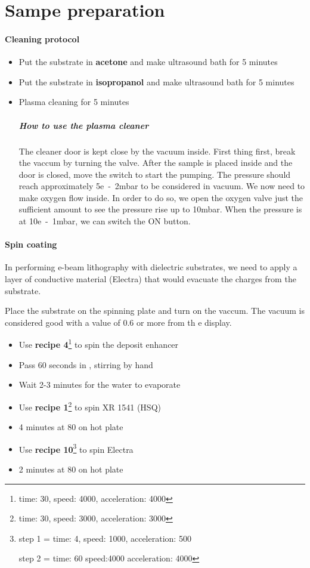 \documentclass[a4paper]{article}
\begin{document}
\section{Sampe preparation}

\paragraph{Cleaning protocol}
\begin{itemize}
  \item Put the substrate in \textbf{acetone} and make ultrasound bath for 5 minutes
  \item Put the substrate in \textbf{isopropanol} and make ultrasound bath for 5 minutes
  \item Plasma cleaning for 5 minutes
\subparagraph{How to use the plasma cleaner}
The cleaner door is kept close by the vacuum inside. First thing first, break the vaccum by turning the valve. After the sample is placed inside and the door is closed, move the switch to start the pumping. The pressure should reach approximately \unit{5e-2}{}mbar to be considered in vacuum. We now need to make oxygen flow inside. In order to do so, we open the oxygen valve just the sufficient amount to see the pressure rise up to \unit{10}{}mbar. When the pressure is at \unit{10e-1}{}mbar, we can switch the ON button.
\end{itemize}
\paragraph{Spin coating}
In performing e-beam lithography with dielectric substrates, we need to apply a layer of conductive material (Electra) that would evacuate the charges from the substrate.


Place the substrate on the spinning plate and turn on the vaccum. The vacuum is considered good with a value of 0.6 or more from th e display.
\begin{itemize}
  \item Use \textbf{recipe 4}\footnote{time: 30, speed: 4000, acceleration: 4000} to spin the deposit enhancer
  \item Pass 60 seconds in , stirring by hand
  \item Wait 2-3 minutes for the water to evaporate
  \item Use \textbf{recipe 1}\footnote{time: 30, speed: 3000, acceleration: 3000} to spin XR 1541 (HSQ)
  \item 4 minutes at \unit{80}{\celsius} on hot plate
  \item Use \textbf{recipe 10}\footnote{step 1 =  time: 4, speed: 1000, acceleration: 500

  step 2 = time: 60 speed:4000 acceleration: 4000} to spin Electra
  \item 2 minutes at \unit{80}{\celsius} on hot plate
\end{itemize}
\end{document}
